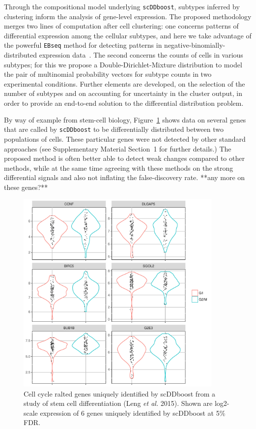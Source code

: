 \documentclass[aoas,preprint]{imsart}
\begin{document}
Through the compositional model underlying \verb+scDDboost+, subtypes inferred by clustering 
inform the analysis of gene-level expression.  The proposed methodology merges two lines of computation
after cell clustering: one concerns patterns of differential expression among 
the cellular subtypes, and here we take advantage of the powerful \verb+EBseq+ method for detecting
patterns in negative-binomially-distributed expression data~\citep{ref:Leng}.  The second concerns 
the counts of cells in various subtypes; for this we propose a Double-Dirichlet-Mixture distribution
to model the pair of multinomial probability vectors for subtype counts in two experimental conditions.
Further elements are developed, on the selection of the number of subtypes and on accounting for uncertainty in the cluster output,  in order to provide an end-to-end solution to the differential distribution
problem.  

By way of example from  stem-cell biology,
Figure~\ref{fig:whet} shows data on several genes that are called by \verb+scDDboost+ to be
differentially distributed between two populations of cells. These particular genes
were not detected by other standard approaches (see Supplementary Material Section~1 for further details.)  
The proposed method is often better able to detect weak changes
compared to other methods, while at the same time 
agreeing with these methods on the strong differential signals and also not inflating the false-discovery rate. 
 **any more on these genes?**

\begin{figure}[H]
\includegraphics[width = 0.9\textwidth]{Figs/density_Fucci_dd.pdf}
 \caption{Cell cycle ralted genes uniquely identified by scDDboost
 from a study of stem cell differentiation (Leng {\em et al.} 2015). Shown are log2-scale expression
of  6 genes uniquely identified by scDDboost at 5\% FDR.  \label{fig:whet} }
\end{figure}
\end{document}
